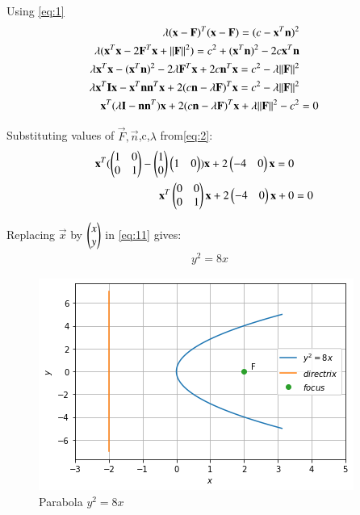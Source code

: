 \documentclass[journal,12pt,twocolumn]{IEEEtran}
\begin{document}
Using \eqref{eq:1}
\begin{align}
\lambda(\mathbf{x}-\mathbf{F})^T(\mathbf{x}-\mathbf{F})=(c-\mathbf{x}^T\mathbf{n})^2
\\
\lambda(\mathbf{x}^T\mathbf{x}-2\mathbf{F}^T\mathbf{x}+\Vert\mathbf{F}\rVert^2)=c^2+(\mathbf{x}^T\mathbf{n})^2-2c\mathbf{x}^T\mathbf{n}\\
\lambda\mathbf{x}^T\mathbf{x}-(\mathbf{x}^T\mathbf{n})^2-2\lambda\mathbf{F}^T\mathbf{x}+2c\mathbf{n}^T\mathbf{x}=c^2-\lambda\Vert\mathbf{F}\rVert^2\\
\lambda\mathbf{x}^T\mathbf{I}\mathbf{x}-\mathbf{x}^T\mathbf{n}\mathbf{n}^T\mathbf{x}+2(c\mathbf{n}-\lambda\mathbf{F})^T\mathbf{x}=c^2-\lambda\Vert\mathbf{F}\rVert^2\\
\mathbf{x}^T(\lambda\mathbf{I}-\mathbf{n}\mathbf{n}^T)\mathbf{x}+2(c\mathbf{n}-\lambda\mathbf{F})^T\mathbf{x}+\lambda\Vert\mathbf{F}\rVert^2-c^2&=0\label{eq:8}
\end{align}


Substituting values of $\vec{F},\vec{n}$,c,$\lambda$ from\eqref{eq:2}:
\begin{align}
\mathbf{x}^T(\begin{pmatrix}1&0\\0&1\end{pmatrix}-\begin{pmatrix}1\\0\end{pmatrix}\begin{pmatrix}1&0\end{pmatrix})\mathbf{x}+2\begin{pmatrix}-4&0\end{pmatrix}\mathbf{x}=0\\
\mathbf{x}^T\begin{pmatrix}0&0\\0&1\end{pmatrix}\mathbf{x}+2\begin{pmatrix}-4&0\end{pmatrix}\mathbf{x}+0&=0\label{eq:11}
\end{align}

Replacing $\vec{x}$ by $\begin{pmatrix}x\\y\end{pmatrix}$ in \eqref{eq:11} gives:
\begin{align}
y^2=8x
\end{align}

\begin{figure}[!ht]
\centering
\includegraphics[width=\columnwidth]{figure4}
\caption{Parabola $y^2=8x$ }
\label{fig:parabola}	
\end{figure}
\end{document}
